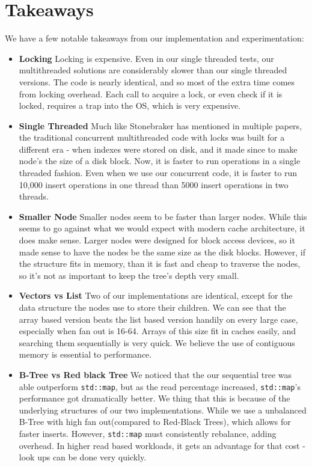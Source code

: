 \documentclass{sig-alternate}
\begin{document}
\section{Takeaways}
We have a few notable takeaways from our implementation and experimentation:
\begin{itemize}
\item \textbf{Locking} Locking is expensive.  Even in our single threaded tests, our multithreaded solutions are considerably slower than our single threaded versions.  The code is nearly identical, and so most of the extra time comes from locking overhead.  Each call to acquire a lock, or even check if it is locked, requires a trap into the OS, which is very expensive.

\item \textbf{Single Threaded} Much like Stonebraker has mentioned in multiple papers, the traditional concurrent multithreaded code with locks was built for a different era - when indexes were stored on disk, and it made since to make node's the size of a disk block.  Now, it is faster to run operations in a single threaded fashion.  Even when we use our concurrent code, it is faster to run 10,000 insert operations in one thread than 5000 insert operations in two threads.

\item \textbf{Smaller Node} Smaller nodes seem to be faster than larger nodes.  While this seems to go against what we would expect with modern cache architecture, it does make sense.  Larger nodes were designed for block access devices, so it made sense to have the nodes be the same size as the disk blocks.  However, if the structure fits in memory, than it is fast and cheap to traverse the nodes, so it's not as important to keep the tree's depth very small.

\item \textbf{Vectors vs List} Two of our implementations are identical, except for the data structure the nodes use to store their children.  We can see that the array based version beats the list based version handily on every large case, especially when fan out is 16-64.  Arrays of this size fit in caches easily, and searching them sequentially is very quick.  We believe the use of contiguous memory is essential to performance.

\item \textbf{B-Tree vs Red black Tree} We noticed that the our sequential tree was able outperform \texttt{std::map}, but as the read percentage increased, \texttt{std::map}'s performance got dramatically better.  We thing that this is because of the underlying structures of our two implementations.  While we use a unbalanced B-Tree with high fan out(compared to Red-Black Trees), which allows for faster inserts.  However, \texttt{std::map} must consistently rebalance, adding overhead.  In higher read based workloads, it gets an advantage for that cost - look ups can be done very quickly.

\end{itemize}
\end{document}
